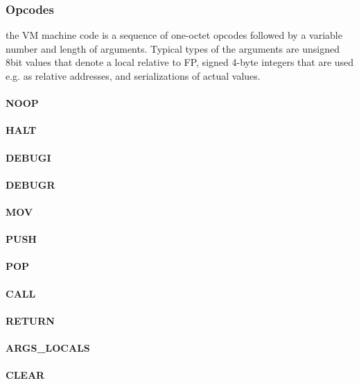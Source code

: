 \documentclass[12pt,a4paper]{article}
\begin{document}

\subsubsection{Opcodes}\label{sec:opcodes}

the VM machine code is a sequence of one-octet opcodes followed by a variable number and length of arguments. Typical types of the arguments are unsigned 8bit values that denote a local relative to FP, signed 4-byte integers that are used e.g. as relative addresses, and serializations of actual values.

\paragraph{NOOP}
\paragraph{HALT}
\paragraph{DEBUGI}
\paragraph{DEBUGR}
\paragraph{MOV}
\paragraph{PUSH}
\paragraph{POP}
\paragraph{CALL}
\paragraph{RETURN}
\paragraph{ARGS\_LOCALS}
\paragraph{CLEAR}
\end{document}
